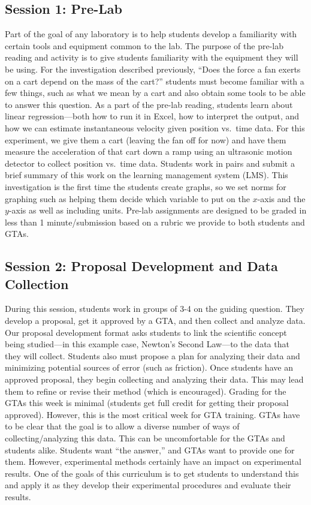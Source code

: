 \documentclass[aip, numerical, preprint]{revtex4-2}
\begin{document}
\subsection{Session 1: Pre-Lab}
Part of the goal of any laboratory is to help students develop a familiarity with certain tools
and equipment common to the lab.  The purpose of the pre-lab reading and activity is to give
students familiarity with the equipment they will be using.  For the investigation described
previously, ``Does the force a fan exerts on a cart depend on the mass of the cart?''  students must become familiar with a few things, such as what we mean by a cart and also obtain some tools to be able to answer this question.  As a part of the pre-lab
reading, students learn about linear regression---both how to run it in Excel,
how to interpret the output, and how we can estimate instantaneous velocity given position
vs.\ time data. For this experiment, we give them a cart (leaving the fan off for now) and have
them measure the acceleration of that cart down a ramp using an ultrasonic motion detector to
collect position vs.\ time data.  Students work in pairs and submit a brief
summary of this work on the learning management system (LMS). This investigation is the first
time the students create graphs, so we set norms for graphing such as helping them decide which
variable to put on the $x$-axis and the $y$-axis as well as including units.  Pre-lab assignments
are designed to be graded in less than 1 minute/submission based on a rubric we provide to both
students and GTAs.

\subsection{Session 2: Proposal Development and Data Collection}
During this session, students work in groups of 3-4 on the guiding question.  They develop a
proposal, get it approved by a GTA, and then collect and analyze data.  Our proposal development format asks students to link the scientific concept being studied---in
this example case, Newton's Second Law---to the data that they will collect.  Students also
must propose a plan for analyzing their data and minimizing potential sources of error (such
as friction).  Once students have an approved proposal, they begin collecting and analyzing
their data.  This may lead them to refine or revise their method (which is encouraged).  Grading for the GTAs this week is minimal (students get full credit for getting their
proposal approved).  However, this is the most critical week for GTA training.  GTAs have to be
clear that the goal is to allow a diverse number of ways of collecting/analyzing this
data. This can be uncomfortable for the GTAs and students alike.  Students want ``the answer,''
and GTAs want to provide one for them.  However, experimental methods certainly have an impact
on experimental results. One of the goals of this curriculum is to get students to understand
this and apply it as they develop their experimental procedures and evaluate their results.
\end{document}
